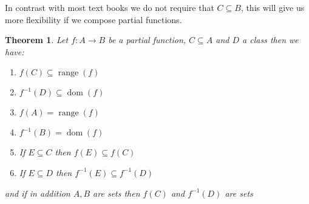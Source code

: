 \documentclass{book}
\newcommand{\tmop}[1]{\ensuremath{\operatorname{#1}}}
\newtheorem{theorem}{Theorem}
\begin{document}
\begin{note}
  In contrast with most text books we do not require that $C \subseteq B$,
  this will give us more flexibility if we compose partial functions.
\end{note}

\begin{theorem}
  \label{partial functions image/preimage properties}Let $f : A \rightarrow B$
  be a partial function, $C \subseteq A$ and $D$ a class then we have:
  \begin{enumerate}
    \item $f (C) \subseteq \tmop{range} (f)$
    
    \item $f^{- 1} (D) \subseteq \tmop{dom} (f)$
    
    \item $f (A) = \tmop{range} (f)$
    
    \item $f^{- 1} (B) = \tmop{dom} (f)$
    
    \item If $E \subseteq C$ then $f (E) \subseteq f (C)$
    
    \item If $E \subseteq D$ then $f^{- 1} (E) \subseteq f^{- 1} (D) $
  \end{enumerate}
  and if in addition $A, B$ are sets then $f (C)$ and $f^{- 1} (D)$ are sets
\end{theorem}
\end{document}
